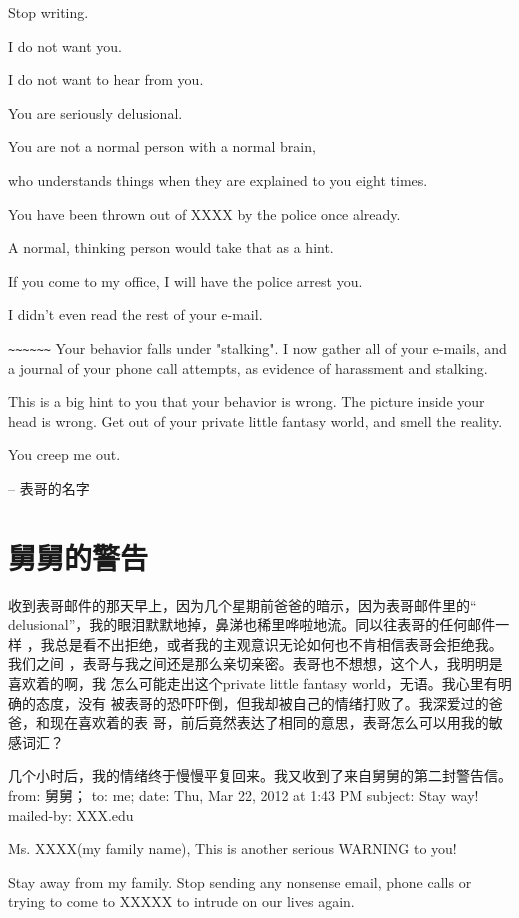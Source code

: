 \documentclass[12pt]{book}
\begin{document}
Stop writing.

I do not want you.

I do not want to hear from you.

You are seriously delusional.

You are not a normal person with a normal brain,

who understands things when they are explained to you eight times.

You have been thrown out of XXXX by the police once already.

A normal, thinking person would take that as a hint.

If you come to my office, I will have the police arrest you.

I didn't even read the rest of your e-mail.

\verb,~~~~~~,
   Your behavior falls under "stalking".
I now gather all of your e-mails, and a journal of your phone call attempts,
as evidence of harassment and stalking.

   This is a big hint to you that your behavior is wrong.
The picture inside your head is wrong.
Get out of your private little fantasy world, and smell the reality.

You creep me out.

--
表哥的名字
\section{舅舅的警告}
\label{sec-9-70}

收到表哥邮件的那天早上，因为几个星期前爸爸的暗示，因为表哥邮件里的“
delusional”，我的眼泪默默地掉，鼻涕也稀里哗啦地流。同以往表哥的任何邮件一样
，我总是看不出拒绝，或者我的主观意识无论如何也不肯相信表哥会拒绝我。我们之间
，表哥与我之间还是那么亲切亲密。表哥也不想想，这个人，我明明是喜欢着的啊，我
怎么可能走出这个private little fantasy world，无语。我心里有明确的态度，没有
被表哥的恐吓吓倒，但我却被自己的情绪打败了。我深爱过的爸爸，和现在喜欢着的表
哥，前后竟然表达了相同的意思，表哥怎么可以用我的敏感词汇？

几个小时后，我的情绪终于慢慢平复回来。我又收到了来自舅舅的第二封警告信。
from: 舅舅； to: me; date: Thu, Mar 22, 2012 at 1:43 PM
subject: Stay way! mailed-by: XXX.edu

Ms. XXXX(my family name),
This is another serious WARNING to you!

Stay away from my family. Stop sending any
nonsense email, phone calls or trying to come to
XXXXX to intrude on our lives again.
\end{document}
